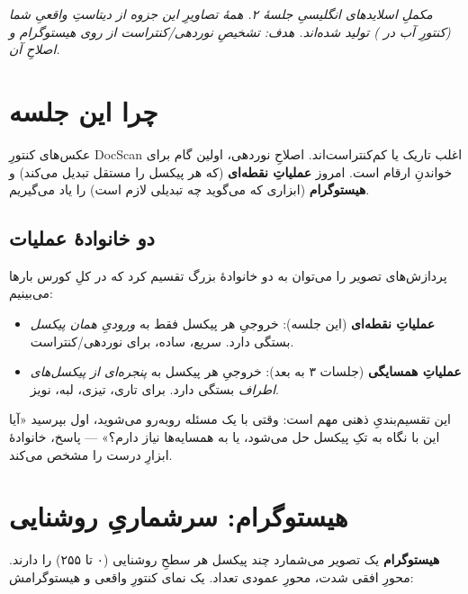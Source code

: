 \documentclass[12pt,a4paper]{article}
\begin{document}

{\small\itshape مکملِ اسلایدهای انگلیسیِ جلسهٔ ۲. همهٔ تصاویرِ این جزوه از دیتاستِ واقعیِ شما (کنتورِ آب در ) تولید شده‌اند. هدف: تشخیصِ نوردهی/کنتراست از روی هیستوگرام و اصلاحِ آن.}

\vspace{0.5cm}
\tableofcontents
\vspace{1cm}

\section{چرا این جلسه}

عکس‌های کنتورِ DocScan اغلب تاریک یا کم‌کنتراست‌اند. اصلاحِ نوردهی، اولین گام برای خواندنِ ارقام
است. امروز \textbf{عملیاتِ نقطه‌ای} (که هر پیکسل را مستقل تبدیل می‌کند) و \textbf{هیستوگرام} (ابزاری
که می‌گوید چه تبدیلی لازم است) را یاد می‌گیریم.

\subsection{دو خانوادهٔ عملیات}

پردازش‌های تصویر را می‌توان به دو خانوادهٔ بزرگ تقسیم کرد که در کلِ کورس بارها می‌بینیم:

\begin{itemize}
  \item \textbf{عملیاتِ نقطه‌ای} (این جلسه): خروجیِ هر پیکسل فقط به \emph{ورودیِ همان پیکسل} بستگی
        دارد. سریع، ساده، برای نوردهی/کنتراست.
  \item \textbf{عملیاتِ همسایگی} (جلسات ۳ به بعد): خروجیِ هر پیکسل به \emph{پنجره‌ای از پیکسل‌های
        اطراف} بستگی دارد. برای تاری، تیزی، لبه، نویز.
\end{itemize}

این تقسیم‌بندیِ ذهنی مهم است: وقتی با یک مسئله روبه‌رو می‌شوید، اول بپرسید «آیا این با نگاه به تکِ
پیکسل حل می‌شود، یا به همسایه‌ها نیاز دارم؟» — پاسخ، خانوادهٔ ابزارِ درست را مشخص می‌کند.

\section{هیستوگرام: سرشماریِ روشنایی}

\textbf{هیستوگرام} یک تصویر می‌شمارد چند پیکسل هر سطحِ روشنایی (۰ تا ۲۵۵) را دارند. محورِ افقی
شدت، محورِ عمودی تعداد. یک نمای کنتورِ واقعی و هیستوگرامش:
\end{document}
